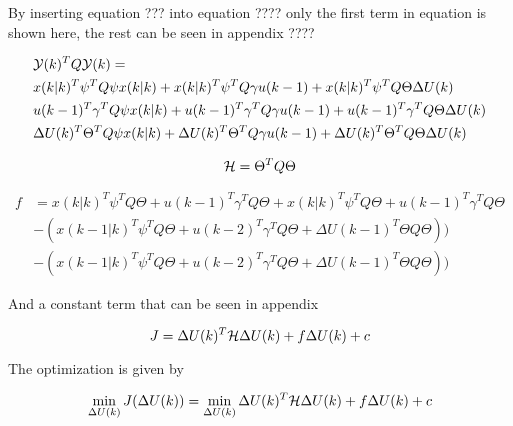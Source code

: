 

By inserting equation ??? into equation ???? only the first term in equation is shown here, the rest can be seen in appendix ????

\begin{equation}
	\begin{aligned}
	&\CMcal{Y}(k)^TQ\CMcal{Y}(k) = \\
	& x(k|k)^T\psi ^T Q \psi x(k|k) + x(k|k)^T \psi ^T Q \gamma u(k-1) + x(k|k)^T \psi ^T Q \Theta \Delta U(k) \\
	& u(k-1)^T \gamma ^T Q \psi x(k|k) +  u(k-1)^T \gamma ^T Q \gamma u(k-1) + u(k-1)^T \gamma ^T Q\Theta \Delta U(k)\\ 
	& \Delta U(k)^T \Theta ^T Q  \psi x(k|k)+\Delta U(k)^T \Theta ^T Q \gamma u(k-1) +\Delta U(k)^T \Theta ^T Q \Theta \Delta U(k)
	\end{aligned}
\end{equation}



\begin{equation}
	\CMcal{H} = \Theta^T Q\Theta 
\end{equation}

\begin{equation}
	\begin{aligned}
	f &= x(k|k)^T\psi ^T Q\Theta+u(k-1)^T\gamma ^T Q \Theta +x(k|k)^T\psi^T Q \Theta+u(k-1)^T \gamma ^T Q \Theta \\
	& -(x(k-1|k)^T \psi^T Q \Theta+u(k-2)^T \gamma^T Q \Theta +\Delta U(k-1)^T\Theta Q \Theta)) \\
	& -(x(k-1|k)^T \psi^T Q \Theta + u(k-2)^T \gamma^T Q \Theta +\Delta U(k-1)^T\Theta Q \Theta))
	\end{aligned}
\end{equation}

And a constant term that can be seen in appendix

\begin{equation}
	J = \Delta U(k)^T\CMcal{H}\Delta U(k)+ f\Delta U(k)+ c
\end{equation}

The optimization is given by

\begin{equation}
	\min_{\Delta U(k)} J(\Delta U(k)) =\min_{\Delta U(k)} \Delta U(k)^T\CMcal{H}\Delta U(k)+f\Delta U(k)+c
\end{equation}